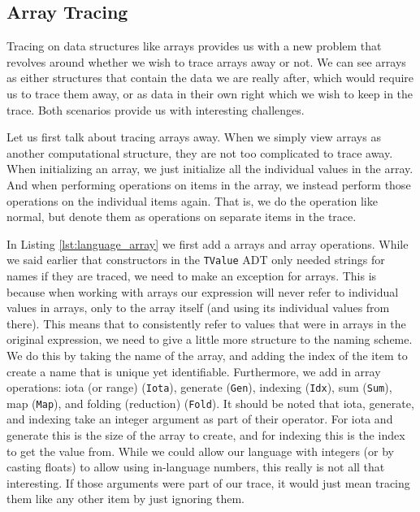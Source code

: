     \subsection{Array Tracing} \label{sec:arrays}
        Tracing on data structures like arrays provides us with a new problem that revolves around whether we wish to trace arrays away or not.
        We can see arrays as either structures that contain the data we are really after, which would require us to trace them away, or as data in their own right which we wish to keep in the trace.
        Both scenarios provide us with interesting challenges.
        
        Let us first talk about tracing arrays away.
        When we simply view arrays as another computational structure, they are not too complicated to trace away.
        When initializing an array, we just initialize all the individual values in the array.
        And when performing operations on items in the array, we instead perform those operations on the individual items again.
        That is, we do the operation like normal, but denote them as operations on separate items in the trace.
        
        In Listing \ref{lst:language_array} we first add a arrays and array operations.
        While we said earlier that constructors in the \texttt{TValue} ADT only needed strings for names if they are traced, we need to make an exception for arrays.
        This is because when working with arrays our expression will never refer to individual values in arrays, only to the array itself (and using its individual values from there).
        This means that to consistently refer to values that were in arrays in the original expression, we need to give a little more structure to the naming scheme.
        We do this by taking the name of the array, and adding the index of the item to create a name that is unique yet identifiable. 
        Furthermore, we add in array operations: iota (or range) (\texttt{Iota}), generate (\texttt{Gen}), indexing (\texttt{Idx}), sum (\texttt{Sum}), map (\texttt{Map}), and folding (reduction) (\texttt{Fold}).
        It should be noted that iota, generate, and indexing take an integer argument as part of their operator.
        For iota and generate this is the size of the array to create, and for indexing this is the index to get the value from.
        While we could allow our language with integers (or by casting floats) to allow using in-language numbers, this really is not all that interesting.
        If those arguments were part of our trace, it would just mean tracing them like any other item by just ignoring them.

